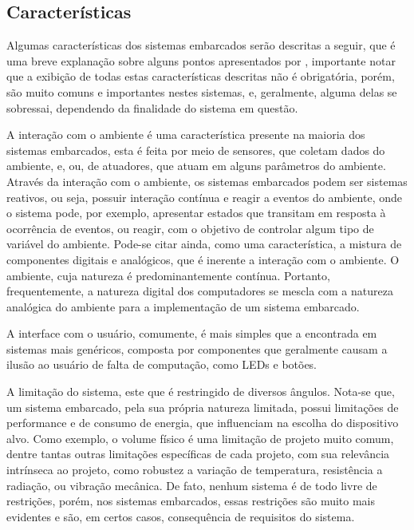 \subsection{\textbf{Características}}
\label{subsec:sub01_Caracteristicas}
Algumas características dos sistemas embarcados serão descritas a seguir, que é uma breve explanação sobre alguns pontos apresentados por , importante notar que a exibição de todas estas características descritas não é obrigatória, porém, são muito comuns e importantes nestes sistemas, e, geralmente, alguma delas se sobressai, dependendo da finalidade do sistema em questão.

 A interação com o ambiente é uma característica presente na maioria dos sistemas embarcados, esta é feita por meio de sensores, que coletam dados do ambiente, e, ou, de atuadores, que atuam em alguns parâmetros do ambiente. Através da interação com o ambiente, os sistemas embarcados podem ser sistemas reativos, ou seja, possuir interação contínua e reagir a eventos do ambiente, onde o sistema pode, por exemplo, apresentar estados que transitam em resposta à ocorrência de eventos, ou reagir, com o objetivo de controlar algum tipo de variável do ambiente. Pode-se citar ainda, como uma característica, a mistura de componentes digitais e analógicos, que é inerente a interação com o ambiente. O ambiente, cuja natureza é predominantemente contínua. Portanto, frequentemente, a natureza digital dos computadores se mescla com a natureza analógica do ambiente para a implementação de um sistema embarcado.
 
A interface com o usuário, comumente, é mais simples que a encontrada em sistemas mais genéricos, composta por componentes que geralmente causam a ilusão ao usuário de falta de computação, como LEDs e botões.

A limitação do sistema, este que é restringido de diversos ângulos. Nota-se que, um sistema embarcado, pela sua própria natureza limitada, possui limitações de performance e de consumo de energia, que influenciam na escolha do dispositivo alvo. Como exemplo, o volume físico é uma limitação de projeto muito comum, dentre tantas outras limitações específicas de cada projeto, com sua relevância intrínseca ao projeto, como robustez a variação de temperatura, resistência a radiação, ou vibração mecânica. De fato, nenhum sistema é de todo livre de restrições, porém, nos sistemas embarcados, essas restrições são muito mais evidentes e são, em certos casos, consequência de requisitos do sistema.

